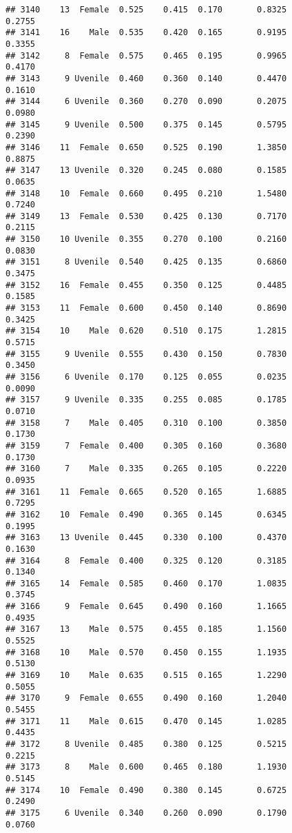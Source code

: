 \documentclass[
]{article}
\begin{document}
\begin{verbatim}
## 3140    13  Female  0.525    0.415  0.170       0.8325         0.2755
## 3141    16    Male  0.535    0.420  0.165       0.9195         0.3355
## 3142     8  Female  0.575    0.465  0.195       0.9965         0.4170
## 3143     9 Uvenile  0.460    0.360  0.140       0.4470         0.1610
## 3144     6 Uvenile  0.360    0.270  0.090       0.2075         0.0980
## 3145     9 Uvenile  0.500    0.375  0.145       0.5795         0.2390
## 3146    11  Female  0.650    0.525  0.190       1.3850         0.8875
## 3147    13 Uvenile  0.320    0.245  0.080       0.1585         0.0635
## 3148    10  Female  0.660    0.495  0.210       1.5480         0.7240
## 3149    13  Female  0.530    0.425  0.130       0.7170         0.2115
## 3150    10 Uvenile  0.355    0.270  0.100       0.2160         0.0830
## 3151     8 Uvenile  0.540    0.425  0.135       0.6860         0.3475
## 3152    16  Female  0.455    0.350  0.125       0.4485         0.1585
## 3153    11  Female  0.600    0.450  0.140       0.8690         0.3425
## 3154    10    Male  0.620    0.510  0.175       1.2815         0.5715
## 3155     9 Uvenile  0.555    0.430  0.150       0.7830         0.3450
## 3156     6 Uvenile  0.170    0.125  0.055       0.0235         0.0090
## 3157     9 Uvenile  0.335    0.255  0.085       0.1785         0.0710
## 3158     7    Male  0.405    0.310  0.100       0.3850         0.1730
## 3159     7  Female  0.400    0.305  0.160       0.3680         0.1730
## 3160     7    Male  0.335    0.265  0.105       0.2220         0.0935
## 3161    11  Female  0.665    0.520  0.165       1.6885         0.7295
## 3162    10  Female  0.490    0.365  0.145       0.6345         0.1995
## 3163    13 Uvenile  0.445    0.330  0.100       0.4370         0.1630
## 3164     8  Female  0.400    0.325  0.120       0.3185         0.1340
## 3165    14  Female  0.585    0.460  0.170       1.0835         0.3745
## 3166     9  Female  0.645    0.490  0.160       1.1665         0.4935
## 3167    13    Male  0.575    0.455  0.185       1.1560         0.5525
## 3168    10    Male  0.570    0.450  0.155       1.1935         0.5130
## 3169    10    Male  0.635    0.515  0.165       1.2290         0.5055
## 3170     9  Female  0.655    0.490  0.160       1.2040         0.5455
## 3171    11    Male  0.615    0.470  0.145       1.0285         0.4435
## 3172     8 Uvenile  0.485    0.380  0.125       0.5215         0.2215
## 3173     8    Male  0.600    0.465  0.180       1.1930         0.5145
## 3174    10  Female  0.490    0.380  0.145       0.6725         0.2490
## 3175     6 Uvenile  0.340    0.260  0.090       0.1790         0.0760

\end{verbatim}
\end{document}
